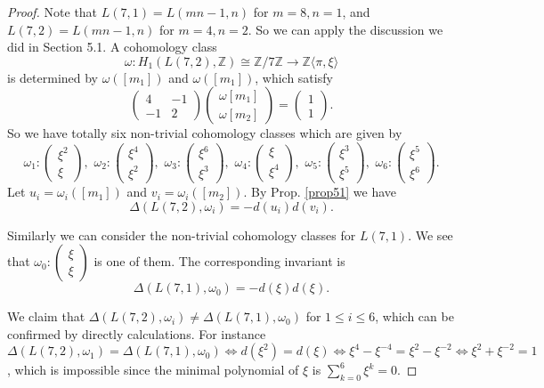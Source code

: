 \documentclass[12pt]{amsart}
\begin{document}
\begin{proof}
Note that $L(7, 1)=L(mn-1, n)$ for $m=8, n=1$, and $L(7, 2)=L(mn-1, n)$ for $m=4, n=2$. So we can apply the discussion we did in Section 5.1.
A cohomology class $$\omega: H_1(L(7, 2), \mathbb{Z})\cong \mathbb{Z}/7\mathbb{Z}\to \mathbb{Z}\langle \pi, \xi \rangle$$ is determined by $\omega([m_1])$ and $\omega([m_1])$, which satisfy 
\[
\left(\begin{matrix} 4 & -1  \\ -1 & 2 \end{matrix}\right)  \left(\begin{matrix} \omega[m_1] \\ \omega[m_2] \end{matrix}\right) = \left(\begin{matrix} 1 \\ 1 \end{matrix}\right).  
\] 
So we have totally six non-trivial cohomology classes which are given by
\[  \omega_1 : \left(\begin{matrix} \xi^2 \\ \xi \end{matrix}\right), \,\,
\omega_2 :\left(\begin{matrix} \xi^4 \\ \xi^2 \end{matrix}\right), \,\,\omega_3 :
\left(\begin{matrix} \xi^6 \\ \xi^3 \end{matrix}\right), \,\, \omega_4 :
\left(\begin{matrix} \xi \\ \xi^4 \end{matrix}\right),  \,\, \omega_5 :
\left(\begin{matrix} \xi^3 \\ \xi^5 \end{matrix}\right),\,\, \omega_6 :
\left(\begin{matrix} \xi^5 \\ \xi^6 \end{matrix}\right).     
\] 
Let $u_i=\omega_i([m_1])$ and $v_i=\omega_i([m_2])$. By Prop. \ref{prop51} we have $$\Delta(L(7, 2), \omega_i)=-d(u_i)d(v_i).$$
 
Similarly we can consider the non-trivial cohomology classes for $L(7, 1)$. We see that $\omega_0:\begin{pmatrix} \xi \\ \xi \end{pmatrix}$ is one of them. The corresponding invariant is
$$\Delta(L(7, 1), \omega_0)=-d(\xi)d(\xi).$$

We claim that $\Delta(L(7, 2), \omega_i)\neq \Delta(L(7, 1), \omega_0)$ for $1\leq i \leq 6$, which can be confirmed by directly calculations. For instance $\Delta(L(7, 2), \omega_1)=\Delta(L(7, 1), \omega_0)\iff d(\xi^2)=d(\xi)\iff \xi^4-\xi^{-4}=\xi^2-\xi^{-2}\iff \xi^2+\xi^{-2}=1$, which is impossible since the minimal polynomial of $\xi$ is $\sum_{k=0}^6\xi^k=0$.
\end{proof}





\end{document}
